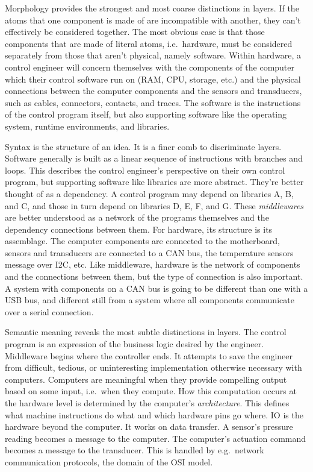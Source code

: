 \documentclass[english,12pt,a4paper,pdftex,eng,utf8]{aaltothesis}
\begin{document}
Morphology provides the strongest and most coarse distinctions in layers. If the atoms that one component is made of are incompatible with another, they can't effectively be considered together. The most obvious case is that those components that are made of literal atoms, i.e.\ hardware, must be considered separately from those that aren't physical, namely software. Within hardware, a control engineer will concern themselves with the components of the computer which their control software run on (RAM, CPU, storage, etc.) and the physical connections between the computer components and the sensors and transducers, such as cables, connectors, contacts, and traces. The software is the instructions of the control program itself, but also supporting software like the operating system, runtime environments, and libraries.

Syntax is the structure of an idea. It is a finer comb to discriminate layers. Software generally is built as a linear sequence of instructions with branches and loops. This describes the control engineer's perspective on their own control program, but supporting software like libraries are more abstract. They're better thought of as a dependency. A control program may depend on libraries A, B, and C, and those in turn depend on libraries D, E, F, and G. These \textit{middlewares} are better understood as a network of the programs themselves and the dependency connections between them. For hardware, its structure is its assemblage. The computer components are connected to the motherboard, sensors and transducers are connected to a CAN bus, the temperature sensors message over I2C, etc. Like middleware, hardware is the network of components and the connections between them, but the type of connection is also important. A system with components on a CAN bus is going to be different than one with a USB bus, and different still from a system where all components communicate over a serial connection.

Semantic meaning reveals the most subtle distinctions in layers. The control program is an expression of the business logic desired by the engineer. Middleware begins where the controller ends. It attempts to save the engineer from difficult, tedious, or uninteresting implementation otherwise necessary with computers. Computers are meaningful when they provide compelling output based on some input, i.e.\ when they compute. How this computation occurs at the hardware level is determined by the computer's \textit{architecture}. This defines what machine instructions do what and which hardware pins go where. IO is the hardware beyond the computer. It works on data transfer. A sensor's pressure reading becomes a message to the computer. The computer's actuation command becomes a message to the transducer. This is handled by e.g.\ network communication protocols, the domain of the OSI model.
\end{document}
